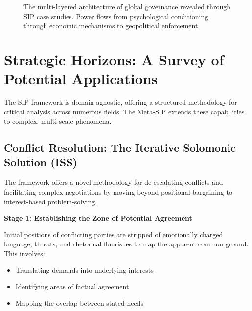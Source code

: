 \documentclass[11pt,a4paper]{article}
\begin{document}
\begin{small}
\begin{figure}[ht]
\caption{The multi-layered architecture of global governance revealed through SIP case studies. Power flows from psychological conditioning through economic mechanisms to geopolitical enforcement.}
\label{fig:governance_pyramid}
\end{figure}

\section{Strategic Horizons: A Survey of Potential Applications}

The SIP framework is domain-agnostic, offering a structured methodology for critical analysis across numerous fields. The Meta-SIP extends these capabilities to complex, multi-scale phenomena.

\subsection{Conflict Resolution: The Iterative Solomonic Solution (ISS)}

The framework offers a novel methodology for de-escalating conflicts and facilitating complex negotiations by moving beyond positional bargaining to interest-based problem-solving.

\textbf{Stage 1: Establishing the Zone of Potential Agreement}

Initial positions of conflicting parties are stripped of emotionally charged language, threats, and rhetorical flourishes to map the apparent common ground. This involves:
\begin{itemize}[nosep]
    \item Translating demands into underlying interests
    \item Identifying areas of factual agreement
    \item Mapping the overlap between stated needs
\end{itemize}


\end{small}
\end{document}
